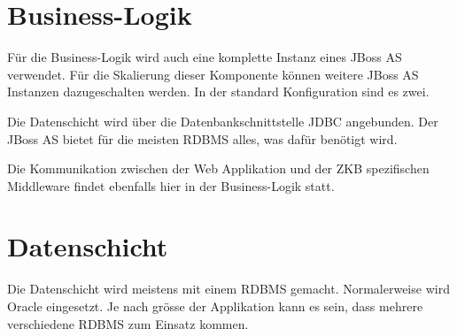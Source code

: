   \section{Business-Logik}
  
  Für die Business-Logik wird auch eine komplette Instanz eines JBoss AS
  verwendet. Für die Skalierung dieser Komponente können weitere JBoss AS
  Instanzen dazugeschalten werden. In der standard Konfiguration sind es zwei.
  
  Die Datenschicht wird über die Datenbankschnittstelle \ac{JDBC} angebunden.
  Der JBoss AS bietet für die meisten \ac{RDBMS} alles, was dafür benötigt
  wird.
  
  Die Kommunikation zwischen der Web Applikation und der ZKB spezifischen
  Middleware findet ebenfalls hier in der Business-Logik statt.
  
  \section{Datenschicht}
  
  Die Datenschicht wird meistens mit einem \ac{RDBMS} gemacht. Normalerweise
  wird Oracle eingesetzt. Je nach grösse der Applikation kann es sein, dass
  mehrere verschiedene \ac{RDBMS} zum Einsatz kommen.

